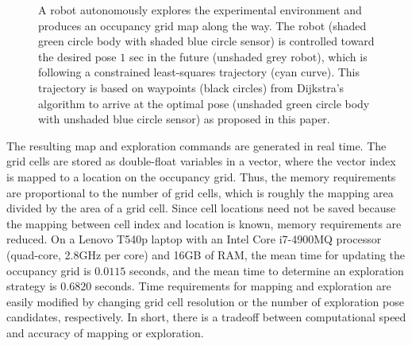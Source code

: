 \begin{figure}
{	}
\caption{A robot autonomously explores the experimental environment and produces an occupancy grid map along the way. The robot (shaded green circle body with shaded blue circle sensor) is controlled toward the desired pose $1$ sec in the future (unshaded grey robot), which is following a constrained least-squares trajectory (cyan curve). This trajectory is based on waypoints (black circles) from Dijkstra's algorithm to arrive at the optimal pose (unshaded green circle body with unshaded blue circle sensor) as proposed in this paper.}
\label{fig:ExperimentOGM}
\end{figure}

The resulting map and exploration commands are generated in real time. The grid cells are stored as double-float variables in a vector, where the vector index is mapped to a location on the occupancy grid. Thus, the memory requirements are proportional to the number of grid cells, which is roughly the mapping area divided by the area of a grid cell. Since cell locations need not be saved because the mapping between cell index and location is known, memory requirements are reduced. On a Lenovo T540p laptop with an Intel Core i7-4900MQ processor (quad-core, 2.8GHz per core) and 16GB of RAM, the mean time for updating the occupancy grid is $0.0115$ seconds, and the mean time to determine an exploration strategy is $0.6820$ seconds. Time requirements for mapping and exploration are easily modified by changing grid cell resolution or the number of exploration pose candidates, respectively. In short, there is a tradeoff between computational speed and accuracy of mapping or exploration.


